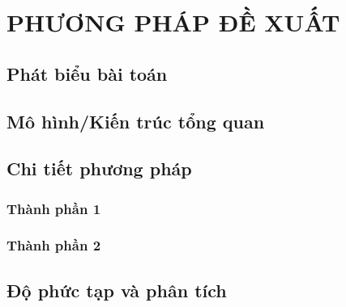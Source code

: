 \chapter{PHƯƠNG PHÁP ĐỀ XUẤT}
\label{chap:phuongphap}

\section{Phát biểu bài toán}

\section{Mô hình/Kiến trúc tổng quan}

\section{Chi tiết phương pháp}
\subsection{Thành phần 1}
\subsection{Thành phần 2}

\section{Độ phức tạp và phân tích}

